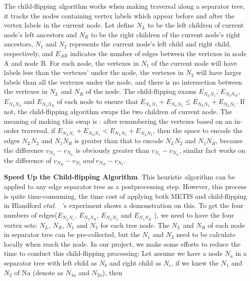 \documentclass[12pt,glossary]{dalthesis}
\begin{document}
\bigskip
\bigskip

The child-flipping algorithm works when making traversal along a separator tree, it tracks the nodes containing vertex labels which appear before and after the vertex labels in the current node. Let define $N_{L}$ to be the left children of current node's left ancestors and $N_{R}$ to be the right children of the current node's right ancestors, $N_{1}$ and $N_{2}$ represents the current node's left child and right child, respectively, and $E_{AB}$ indicates the number of edges between the vertexes in node A and node B. For each node, the vertexes in $N_{1}$ of the current node will have labels less than the vertexes' under the node, the vertexes in $N_{2}$ will have larger labels than all the vertexes under the node, and there is no intersection between the vertexes in $N_{L}$ and $N_{R}$ of the node. The child-flipping exams $E_{N_{L}N_{1}}$, $E_{N_{2}N_{R}}$, $E_{N_{L}N_{2}}$ and $E_{N_{1}N_{R}}$ of each node to ensure that $E_{N_{L}N_{1}} + E_{N_{L}N_{1}} \leq E_{N_{L}N_{1}} + E_{N_{L}N_{1}}$. If not, the child-flipping algorithm swaps the two children of current node. The meaning of making this swap is : after renumbering the vertexes based on an in-order traversal, if $E_{N_{L}N_{1}} + E_{N_{L}N_{1}} < E_{N_{L}N_{1}} + E_{N_{L}N_{1}}$, then the space to encode the edges $N_{L}N_{2}$ and $N_{1}N_{R}$ is greater than that to encode $N_{L}N_{2}$ and $N_{1}N_{R}$, because the difference $v_{N_{2}} -v_{N_{L}}$ is obviously greater than $v_{N_{1}} - v_{N_{L}}$, similar fact works on the difference of $v_{N_{R}}-v_{N_{1}} \  and \  v_{N_{R}}-v_{N_{2}}$.

\bigskip
\bigskip

\textbf{Speed Up the Child-flipping Algorithm}. This heuristic algorithm can be applied to any edge separator tree as a postprocessing step. However, this process is quite time-consuming, the time cost of applying both METIS and child-flipping in Blandford $et al.$ ~\cite{compact-representation}'s experiment shows a demonstration on this. To get the four numbers of edges($E_{N_{L}N_{1}}$, $E_{N_{2}N_{R}}$, $E_{N_{L}N_{2}}$ and $E_{N_{1}N_{R}}$ ), we need to have the four vertex sets: $N_{L}$, $N_{R}$, $N_{1}$ and $N_{2}$ for each tree node. The $N_{L}$ and $N_{R}$ of each node in separator tree can be pre-collected, but the $N_{1}$ and $N_{2}$ need to be calculate locally when reach the node. In our project, we make some efforts to reduce the time to conduct this child-flipping processing: Let assume we have a node $N_{a}$ in a separator tree with left child as $N_{b}$ and right child as $N_{c}$, if we knew the $N_{1}$ and $N_{2}$ of Na (denote as $N_{1a}$ and $N_{2a}$), then
\end{document}
